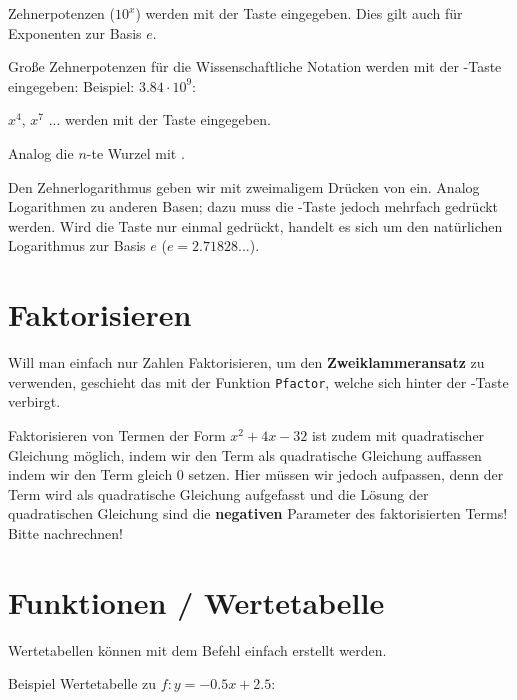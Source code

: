 Zehnerpotenzen ($10^x$) werden mit der Taste  eingegeben. Dies gilt auch für Exponenten zur Basis $e$.

Große Zehnerpotenzen\label{ee} für die Wissenschaftliche Notation werden mit der -Taste eingegeben: Beispiel: $3.84 \cdot{} 10^9$:\\

$x^4$, $x^7$ ... werden mit der Taste  eingegeben.

Analog die $n$-te Wurzel mit .

Den Zehnerlogarithmus geben wir mit zweimaligem Drücken
von   ein. Analog Logarithmen zu anderen
Basen; dazu muss die -Taste jedoch mehrfach gedrückt
werden.
Wird die Taste  nur einmal gedrückt, handelt es sich um
den natürlichen Logarithmus zur Basis $e$ ($e = 2.71828...$).



\section{Faktorisieren}\label{faktorisieren}


Will man einfach nur Zahlen Faktorisieren, \zB um den \textbf{Zweiklammeransatz} zu verwenden, geschieht das mit der Funktion \texttt{Pfactor}, welche sich hinter der -Taste verbirgt.

Faktorisieren von Termen der Form $x^2 +4x -32$ ist zudem mit
quadratischer Gleichung möglich, indem wir den Term als quadratische
Gleichung auffassen indem wir den Term gleich 0 setzen. Hier müssen wir jedoch aufpassen, denn der Term wird als quadratische Gleichung aufgefasst und die Lösung der quadratischen Gleichung sind die \textbf{negativen} Parameter des faktorisierten Terms! Bitte nachrechnen!
\newpage

\section{Funktionen / Wertetabelle}\label{wertetabelle}
Wertetabellen können mit dem Befehl  einfach erstellt
werden.

Beispiel Wertetabelle zu $f: y=-0.5x + 2.5$:


